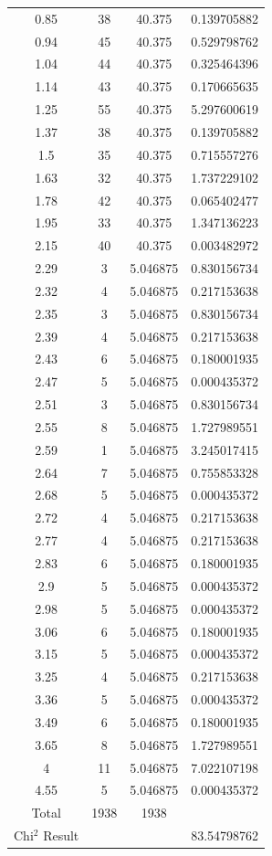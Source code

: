 \begin{center}
{\begin{tabular}{|c|c|c|c|}
0.85	&	38	&	40.375	&	0.139705882	\\
0.94	&	45	&	40.375	&	0.529798762	\\
1.04	&	44	&	40.375	&	0.325464396	\\ 
1.14	&	43	&	40.375	&	0.170665635	\\
1.25	&	55	&	40.375	&	5.297600619	\\
1.37	&	38	&	40.375	&	0.139705882	\\
1.5	&	35	&	40.375	&	0.715557276	\\
1.63	&	32	&	40.375	&	1.737229102	\\
1.78	&	42	&	40.375	&	0.065402477	\\
1.95	&	33	&	40.375	&	1.347136223	\\
2.15	&	40	&	40.375	&	0.003482972	\\
2.29	&	3	&	5.046875	&	0.830156734	\\
2.32	&	4	&	5.046875	&	0.217153638	\\
2.35	&	3	&	5.046875	&	0.830156734	\\
2.39	&	4	&	5.046875	&	0.217153638	\\
2.43	&	6	&	5.046875	&	0.180001935	\\
2.47	&	5	&	5.046875	&	0.000435372	\\
2.51	&	3	&	5.046875	&	0.830156734	\\
2.55	&	8	&	5.046875	&	1.727989551	\\
2.59	&	1	&	5.046875	&	3.245017415	\\
2.64	&	7	&	5.046875	&	0.755853328	\\
2.68	&	5	&	5.046875	&	0.000435372	\\
2.72	&	4	&	5.046875	&	0.217153638	\\
2.77	&	4	&	5.046875	&	0.217153638	\\
2.83	&	6	&	5.046875	&	0.180001935	\\
2.9	&	5	&	5.046875	&	0.000435372	\\
2.98	&	5	&	5.046875	&	0.000435372	\\
3.06	&	6	&	5.046875	&	0.180001935	\\
3.15	&	5	&	5.046875	&	0.000435372	\\
3.25	&	4	&	5.046875	&	0.217153638	\\
3.36	&	5	&	5.046875	&	0.000435372	\\
3.49	&	6	&	5.046875	&	0.180001935	\\
3.65	&	8	&	5.046875	&	1.727989551	\\
4	&	11	&	5.046875	&	7.022107198	\\
4.55	&	5	&	5.046875	&	0.000435372	\\ \hline
Total	& 	1938	&1938	 &\\\hline
Chi$^2$ Result	 	 &&&	 	83.54798762\\\hline
\end{tabular}
}
\end{center}

